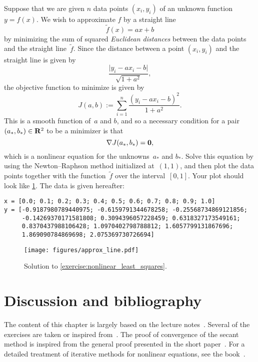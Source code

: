 \begin{exercise}
    \label{exercise:nonlinear_least_squares}
    Suppose that we are given $n$ data points $(x_i, y_i)$ of an unknown function~$y = f(x)$.
    We wish to approximate $f$ by a straight line
    \[
        \widetilde f(x) = ax + b
    \]
    by minimizing the sum of squared \emph{Euclidean distances} between the data points and the straight line~$\widetilde f$.
    Since the distance between a point $(x_i, y_i)$ and the straight line is given by
    \[
        \frac{\lvert y_i - a x_i - b \rvert}{\sqrt{1+a^2}},
    \]
    the objective function to minimize is given by
    \[
        J(a, b) := \sum_{i=1}^{n} \frac{ \left( y_i - a x_i - b \right)^2 }{1+a^2}.
    \]
    This is a smooth function of~$a$ and $b$,
    and so a necessary condition for a pair $(a_*, b_*) \in \mathbf R^2$ to be a minimizer is that
    \[
        \nabla J(a_*, b_*) = \mathbf{\boldsymbol{0}},
    \]
    which is a nonlinear equation for the unknowns~$a_*$ and $b_*$.
    Solve this equation by using the Newton--Raphson method initialized at~$(1, 1)$,
    and then plot the data points together with the function~$\widetilde f$ over the interval~$[0, 1]$.
    Your plot should look like \cref{fig:solution_exercise_approximation_least_squares}.
    The data is given hereafter:
    \begin{verbatim}
x = [0.0; 0.1; 0.2; 0.3; 0.4; 0.5; 0.6; 0.7; 0.8; 0.9; 1.0]
y = [-0.9187980789440975; -0.6159791344678258; -0.25568734869121856;
     -0.14269370171581808; 0.3094396057228459; 0.6318327173549161;
     0.8370437988106428; 1.0970402798788812; 1.6057799131867696;
     1.869090784869698; 2.075369730726694]
    \end{verbatim}
    \begin{figure}[ht]
        \centering
        \texttt{[image: figures/approx\_line.pdf]}
        \caption{Solution to \cref{exercise:nonlinear_least_squares}.}%
        \label{fig:solution_exercise_approximation_least_squares}
    \end{figure}
\end{exercise}

\section{Discussion and bibliography}

The content of this chapter is largely based on the lecture notes~\cite{VanDooren}.
Several of the exercises are taken or inspired from~\cite{Legat}.
The proof of convergence of the secant method is inspired from the general proof presented in the short paper~\cite{MR1186462}.
For a detailed treatment of iterative methods for nonlinear equations,
see the book~\cite{MR1744713}.
